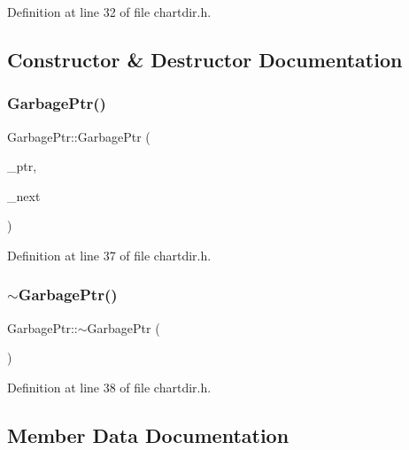 Definition at line 32 of file chartdir.\+h.



\subsection{Constructor \& Destructor Documentation}
\mbox{\label{class_garbage_ptr_ad2798acd0926c686a0f5a6750312b09d}} 
\subsubsection{\texorpdfstring{Garbage\+Ptr()}{GarbagePtr()}}
{\footnotesize\ttfamily Garbage\+Ptr\+::\+Garbage\+Ptr (\begin{DoxyParamCaption}\item[{\hyperlink{class_auto_destroy}{Auto\+Destroy} $\ast$}]{\+\_\+ptr,  }\item[{\hyperlink{class_garbage_ptr}{Garbage\+Ptr} $\ast$}]{\+\_\+next }\end{DoxyParamCaption})\hspace{0.3cm}{\ttfamily [inline]}}



Definition at line 37 of file chartdir.\+h.

\mbox{\label{class_garbage_ptr_a6f930c08dcb1c57cbc0f08b8630048b0}} 
\subsubsection{\texorpdfstring{$\sim$\+Garbage\+Ptr()}{~GarbagePtr()}}
{\footnotesize\ttfamily Garbage\+Ptr\+::$\sim$\+Garbage\+Ptr (\begin{DoxyParamCaption}{ }\end{DoxyParamCaption})\hspace{0.3cm}{\ttfamily [inline]}}



Definition at line 38 of file chartdir.\+h.



\subsection{Member Data Documentation}
\mbox{\label{class_garbage_ptr_a56ec304006d756b7de706f398aafb971}} 
